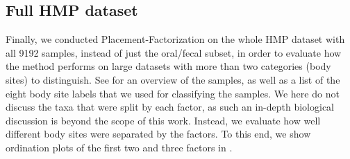 
\subsection{Full HMP dataset}
\label{ch:Factorization:sec:Evaluation:sub:FullHMPDataset}




Finally, we conducted Placement-Factorization on the whole \ac{HMP} dataset with all \num{9192} samples,
instead of just the oral/fecal subset,
in order to evaluate how the method performs on large datasets with more than two categories (body sites) to distinguish.
See  for an overview of the samples, as well as a list of the eight body site labels
that we used for classifying the samples.
We here do not discuss the taxa that were split by each factor,
as such an in-depth biological discussion is beyond the scope of this work.
Instead, we evaluate how well different body sites were separated by the factors.
To this end, we show ordination plots of the first two and three factors in .

